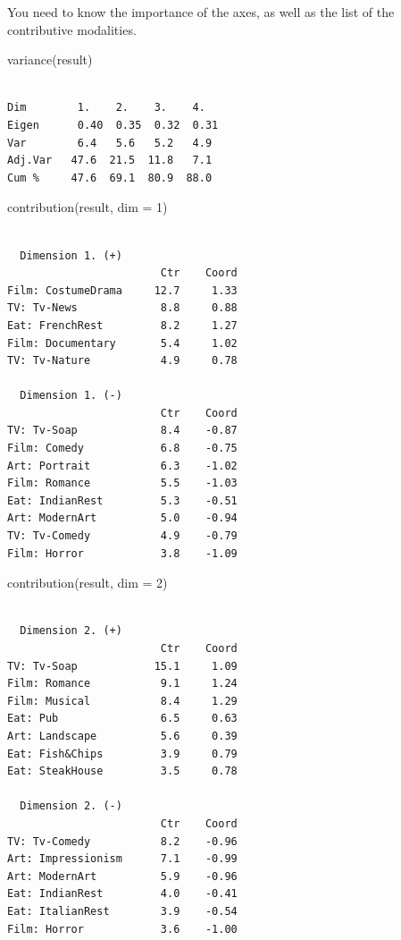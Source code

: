 \documentclass[
  letterpaper,
  DIV=11,
  numbers=noendperiod]{scrartcl}
\newenvironment{Shaded}{\begin{snugshade}}{\end{snugshade}}
\newcommand{\AttributeTok}[1]{\textcolor[rgb]{0.40,0.45,0.13}{#1}}
\newcommand{\DecValTok}[1]{\textcolor[rgb]{0.68,0.00,0.00}{#1}}
\newcommand{\FunctionTok}[1]{\textcolor[rgb]{0.28,0.35,0.67}{#1}}
\newcommand{\NormalTok}[1]{\textcolor[rgb]{0.00,0.23,0.31}{#1}}
\begin{document}
\normalsize

You need to know the importance of the axes, as well as the list of the
contributive modalities.

\scriptsize

\begin{Shaded}
\begin{Highlighting}[]
\FunctionTok{variance}\NormalTok{(result)}
\end{Highlighting}
\end{Shaded}

\begin{verbatim}

Dim        1.    2.    3.    4.    
Eigen      0.40  0.35  0.32  0.31
Var        6.4   5.6   5.2   4.9
Adj.Var   47.6  21.5  11.8   7.1
Cum %     47.6  69.1  80.9  88.0
\end{verbatim}

\begin{Shaded}
\begin{Highlighting}[]
\FunctionTok{contribution}\NormalTok{(result, }\AttributeTok{dim =} \DecValTok{1}\NormalTok{)}
\end{Highlighting}
\end{Shaded}

\begin{verbatim}

  Dimension 1. (+)  
                        Ctr    Coord
Film: CostumeDrama     12.7     1.33
TV: Tv-News             8.8     0.88
Eat: FrenchRest         8.2     1.27
Film: Documentary       5.4     1.02
TV: Tv-Nature           4.9     0.78

  Dimension 1. (-)  
                        Ctr    Coord
TV: Tv-Soap             8.4    -0.87
Film: Comedy            6.8    -0.75
Art: Portrait           6.3    -1.02
Film: Romance           5.5    -1.03
Eat: IndianRest         5.3    -0.51
Art: ModernArt          5.0    -0.94
TV: Tv-Comedy           4.9    -0.79
Film: Horror            3.8    -1.09
\end{verbatim}

\begin{Shaded}
\begin{Highlighting}[]
\FunctionTok{contribution}\NormalTok{(result, }\AttributeTok{dim =} \DecValTok{2}\NormalTok{)}
\end{Highlighting}
\end{Shaded}

\begin{verbatim}

  Dimension 2. (+)  
                        Ctr    Coord
TV: Tv-Soap            15.1     1.09
Film: Romance           9.1     1.24
Film: Musical           8.4     1.29
Eat: Pub                6.5     0.63
Art: Landscape          5.6     0.39
Eat: Fish&Chips         3.9     0.79
Eat: SteakHouse         3.5     0.78

  Dimension 2. (-)  
                        Ctr    Coord
TV: Tv-Comedy           8.2    -0.96
Art: Impressionism      7.1    -0.99
Art: ModernArt          5.9    -0.96
Eat: IndianRest         4.0    -0.41
Eat: ItalianRest        3.9    -0.54
Film: Horror            3.6    -1.00
\end{verbatim}
\end{document}

